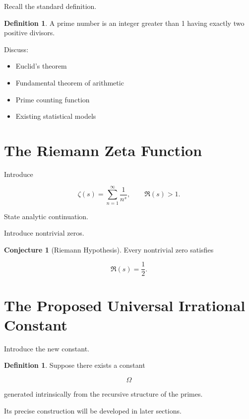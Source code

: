 \documentclass[11pt]{article}
\theoremstyle{definition}
\newtheorem{definition}[theorem]{Definition}
\newtheorem{conjecture}[theorem]{Conjecture}
\theoremstyle{remark}
\begin{document}
Recall the standard definition.

\begin{definition}
A prime number is an integer greater than 1 having exactly two positive divisors.
\end{definition}

Discuss:

\begin{itemize}
\item Euclid's theorem
\item Fundamental theorem of arithmetic
\item Prime counting function
\item Existing statistical models
\end{itemize}

\section{The Riemann Zeta Function}

Introduce

\[
\zeta(s)
=
\sum_{n=1}^{\infty}
\frac1{n^s},
\qquad
\Re(s)>1.
\]

State analytic continuation.

Introduce nontrivial zeros.

\begin{conjecture}[Riemann Hypothesis]

Every nontrivial zero satisfies

\[
\Re(s)=\frac12.
\]

\end{conjecture}

\section{The Proposed Universal Irrational Constant}

Introduce the new constant.

\begin{definition}

Suppose there exists a constant

\[
\Omega
\]

generated intrinsically from the recursive structure of the primes.

Its precise construction will be developed in later sections.

\end{definition}
\end{document}
